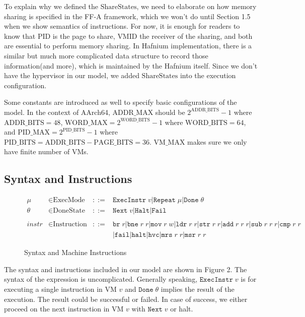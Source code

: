 \documentclass[a4paper]{article}
\newcommand*{\derived}{::=}
\newcommand*{\SSS}{\text{ShareStates}}
\newcommand*{\PID}{\text{PID}}
\newcommand*{\VMID}{\text{VMID}}
\newcommand*{\MODE}{\text{ExecMode}}
\newcommand*{\DONE}{\text{DoneState}}
\newcommand*{\INSTR}{\text{Instruction}}
\newcommand*{\PABITS}{\text{ADDR\_BITS}}
\newcommand*{\PPBITS}{\text{PAGE\_BITS}}
\newcommand*{\PPIDBITS}{\text{PID\_BITS}}
\newcommand*{\PAMAX}{\text{ADDR\_MAX}}
\newcommand*{\PPIDMAX}{\text{PID\_MAX}}
\newcommand*{\PWBITS}{\text{WORD\_BITS}}
\newcommand*{\PWMAX}{\text{WORD\_MAX}}
\newcommand*{\PVMMAX}{\text{VM\_MAX}}
\newcommand*{\instrm}[1]{\mathtt{#1}}
\newcommand*{\EI}[1]{\mathtt{ExecInstr} \; {#1}}
\newcommand*{\DN}[1]{\mathtt{Done} \; {#1}}
\newcommand*{\NXT}[1]{\mathtt{Next} \; {#1}}
\begin{document}
To explain why we defined the $\SSS$, we need to elaborate on how memory sharing is
specified in the FF-A framework, which we won't do until Section 1.5 when we
show semantics of instructions. For now, it is enough for readers to know that $\PID$ is
the page to share, $\VMID$ the receiver of the sharing, and both are essential
to perform memory sharing. In Hafnium implementation, there is a similar but
much more complicated data structure to record those information(and more),
which is maintained by the Hafnium itself. Since we don't have the hypervisor in
our model, we added $\SSS$ into the execution configuration.

Some constants are introduced as well to specify basic configurations of the model. In
the context of AArch64, $\PAMAX$ should be $2^{\PABITS} - 1$ where
$\PABITS = 48$, $\PWMAX = 2^{\PWBITS} -1$ where $\PWBITS = 64$, and
$\PPIDMAX = 2^{\PPIDBITS}-1$ where $\PPIDBITS = \PABITS - \PPBITS = 36$.
$\PVMMAX$ makes sure we only have finite number of VMs.


\subsection{Syntax and Instructions}
\begin{figure}[h!]
  \begin{align*}
    \mu &\in \MODE &\derived & \mathtt{ExecInstr} \; v | \mathtt{Repeat} \; \mu | \mathtt{Done} \; \theta \\
    \theta &\in \DONE &\derived & \NXT{v} | \mathtt{Halt} | \mathtt{Fail}\\
    \\
    instr & \in  \INSTR &\derived & \instrm{br} \; r |\instrm{bne} \; r \; r |
                                    \instrm{mov} \; r \; w | \instrm{ldr} \; r\; r|
                                    \instrm{str} \; r \; r | \instrm{add} \; r \; r \; r |
                                    \instrm{sub} \; r \; r \; r | \instrm{cmp} \; r \; r \\
        & & & | \instrm{fail} | \instrm{halt} | \instrm{hvc} |\instrm{mrs} \; r\;r | \instrm{msr} \; r \; r
  \end{align*}
  \caption{Syntax and Machine Instructions}
\end{figure}
The syntax and instructions included in our model are shown in Figure 2. The
syntax of the expression is uncomplicated. Generally speaking, $\EI{v}$ is for
executing a single instruction in VM $v$ and $\DN{\theta}$ implies the result of
the execution. The result could be successful or failed. In case of success, we
either proceed on the next instruction in VM $v$ with $\NXT{v}$ or halt.
\end{document}
